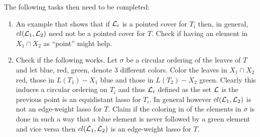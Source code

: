 The following tasks then need to be completed:
\begin{enumerate}
\item An example that shows that if ${\mathcal L}_i$ is a pointed cover for $T_i$ then,
  in general, $cl({\mathcal L}_1,{\mathcal L}_2)$ need not be a pointed cover for $T$. Check if
  having an element in $X_1\cap X_2$ as ``point'' might help.
\item Check if the following works. Let $\sigma$ be a circular ordering of the
  leaves of $T$ and let blue, red, green, denote 3 different colors.  Color
  the leaves in $X_1\cap X_2$ red, those in $L(T_1)-X_1$ blue and those in
  $L(T_2)-X_2$ green. Clearly this induces a circular ordering on $T_i$ and
  thus ${\mathcal L}_i$ defined as the set ${\mathcal L}$ is the previous point is an
  equidistant lasso for $T_i$. In general however $cl({\mathcal L}_1,{\mathcal L}_2)$ is not an
  edge-weight lasso for $T$. Claim if the coloring in of the elements in
  $\sigma$ is done in such a way that a blue element is never followed by a
  green element and vice versa then $cl({\mathcal L}_1,{\mathcal L}_2)$ is an edge-weight lasso
  for $T$.
\end{enumerate}


